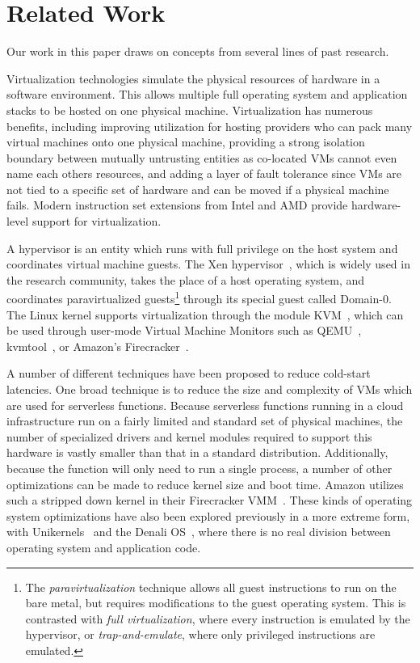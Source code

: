 \section{Related Work} \label{sec:related}
Our work in this paper draws on concepts from several lines of past research.

 Virtualization technologies simulate the
physical resources of hardware in a software environment. This allows multiple
full operating system and application stacks to be hosted on one physical
machine. Virtualization has numerous benefits, including improving utilization
for hosting providers who can pack many virtual machines onto one physical
machine, providing a strong isolation boundary between mutually untrusting
entities as co-located VMs cannot even name each others resources, and adding a
layer of fault tolerance since VMs are not tied to a specific set of hardware
and can be moved if a physical machine fails. Modern instruction set extensions
from Intel and AMD provide hardware-level support for
virtualization.~\cite{virt-techniques}

A hypervisor is an entity which runs with full privilege on the host system and
coordinates virtual machine guests. The Xen hypervisor~\cite{xen}, which is
widely used in the research community, takes the place of a host operating
system, and coordinates paravirtualized guests\footnote{The
\emph{paravirtualization} technique allows all guest instructions to run on the
bare metal, but requires modifications to the guest operating system. This is
contrasted with \emph{full virtualization}, where every instruction is emulated
by the hypervisor, or \emph{trap-and-emulate}, where only privileged
instructions are emulated.} through its special guest called Domain-0. The Linux
kernel supports virtualization through the module KVM~\cite{kvm}, which can be
used through user-mode Virtual Machine Monitors such as QEMU~\cite{qemu},
kvmtool~\cite{kvmtool}, or Amazon's Firecracker~\cite{firecracker}.

 A number of different techniques have
been proposed to reduce cold-start latencies. One broad technique is to reduce
the size and complexity of VMs which are used for serverless functions. Because
serverless functions running in a cloud infrastructure run on a fairly limited
and standard set of physical machines, the number of specialized drivers and
kernel modules required to support this hardware is vastly smaller than that in
a standard distribution.  Additionally, because the function will only need to
run a single process, a number of other optimizations can be made to reduce
kernel size and boot time. Amazon utilizes such a stripped down kernel in their
Firecracker VMM~\cite{firecracker}. These kinds of operating system
optimizations have also been explored previously in a more extreme form, with
Unikernels~\cite{unikernels} and the Denali OS~\cite{denali}, where there is no
real division between operating system and application code.

